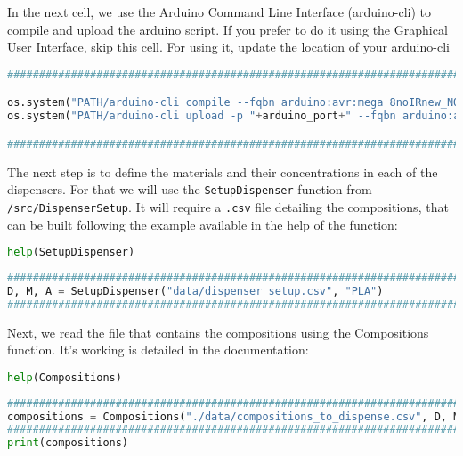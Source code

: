 In the next cell, we use the Arduino Command Line Interface
(arduino-cli) to compile and upload the arduino script. If you prefer to
do it using the Graphical User Interface, skip this cell. For using it,
update the location of your arduino-cli

\begin{lstlisting}[language=Python]
###############################################################################################################

os.system("PATH/arduino-cli compile --fqbn arduino:avr:mega 8noIRnew_NOshaketimer_new/8noIRnew_NOshaketimer_new.ino")
os.system("PATH/arduino-cli upload -p "+arduino_port+" --fqbn arduino:avr:mega 8noIRnew_NOshaketimer_new/8noIRnew_NOshaketimer_new.ino")

###############################################################################################################
\end{lstlisting}

The next step is to define the materials and their concentrations in
each of the dispensers. For that we will use the
\passthrough{\lstinline!SetupDispenser!} function from
\passthrough{\lstinline!/src/DispenserSetup!}. It will require a
\passthrough{\lstinline!.csv!} file detailing the compositions, that can
be built following the example available in the help of the function:

\begin{lstlisting}[language=Python]
help(SetupDispenser)
\end{lstlisting}

\begin{lstlisting}[language=Python]
###############################################################################
D, M, A = SetupDispenser("data/dispenser_setup.csv", "PLA")
###############################################################################
\end{lstlisting}

Next, we read the file that contains the compositions using the
Compositions function. It's working is detailed in the documentation:

\begin{lstlisting}[language=Python]
help(Compositions)
\end{lstlisting}

\begin{lstlisting}[language=Python]
###############################################################################
compositions = Compositions("./data/compositions_to_dispense.csv", D, M, A, "PLA")
###############################################################################
print(compositions)
\end{lstlisting}

